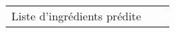 \begin{longtable}{p{7cm}p{7cm}c}
                                                                                                                                                                                                                                                                                                                                                                                                                                                                                                                                                                                                                                                                                                                                                                                                                                                                                                                                                                                                                                                                                                                                                                                                                                                                                                                                                                                                                                                                                                                                                                                                                                                                                                                                                                                                                                                                                                                                                                                                                                                                                                                                                         Liste d'ingrédients prédite &                                                                                                                                                                                                                                                                                                                                                                                                                                                                                                                                                                                                                                                                                                                                                                                                                                                                                                                                                                                                                                                                                                                                                                                                                                                 
\end{longtable}

